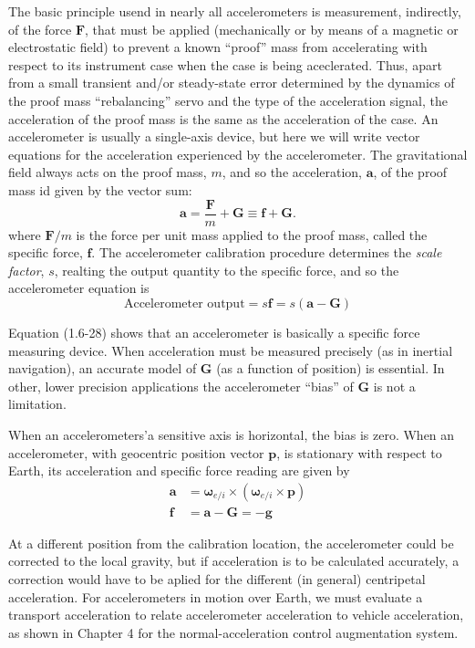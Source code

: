 The basic principle usend in nearly all accelerometers is measurement, indirectly, of the force \(\mathbf{F}\), that must be applied (mechanically or by means of a magnetic or electrostatic field) to prevent a known ``proof'' mass from accelerating with respect to its instrument case when the case is being aceclerated. Thus, apart from a small transient and/or steady-state error determined by the dynamics of the proof mass ``rebalancing'' servo and the type of the acceleration signal, the acceleration of the proof mass is the same as the acceleration of the case. An accelerometer is usually a single-axis device, but here we will write vector equations for the acceleration experienced by the accelerometer. The gravitational field always acts on the proof mass, \(m\), and so the acceleration, \(\mathbf{a}\), of the proof mass id given by the vector sum:
\begin{equation*}
    \mathbf{a} = \dfrac{\mathbf{F}}{m} + \mathbf{G} \equiv \mathbf{f} + \mathbf{G}.
\end{equation*}
where \(\mathbf{F}/m\) is the force per unit mass applied to the proof mass, called the specific force, \(\mathbf{f}\). The accelerometer calibration procedure determines the \textit{scale factor}, \(s\), realting the output quantity to the specific force, and so the accelerometer equation is
\begin{equation*} \tag{1.6-28}
    \text{Accelerometer output} = s \mathbf{f} = s \left(\mathbf{a} - \mathbf{G} \right)
\end{equation*}

Equation (1.6-28) shows that an accelerometer is basically a specific force measuring device. When acceleration must be measured precisely (as in inertial navigation), an accurate model of \(\mathbf{G}\) (as a function of position) is essential. In other, lower precision applications the accelerometer ``bias'' of \(\mathbf{G}\) is not a limitation.

When an accelerometers'a sensitive axis is horizontal, the bias is zero. When an accelerometer, with geocentric position vector \(\mathbf{p}\), is stationary with respect to Earth, its acceleration and specific force reading are given by
\begin{align*}
    \mathbf{a} &= {\mathbf{\omega}_{e/i}}\!\times\!\left({\mathbf{\omega}_{e/i}}\!\times\!{\mathbf{p}}\right) \\
    \mathbf{f} &= \mathbf{a} - \mathbf{G} = -\!{\mathbf{g}} \tag{1.6-29}
\end{align*}

At a different position from the calibration location, the accelerometer could be corrected to the local gravity, but if acceleration is to be calculated accurately, a correction would have to be aplied for the different (in general) centripetal acceleration. For accelerometers in motion over Earth, we must evaluate a transport acceleration to relate accelerometer acceleration to vehicle acceleration, as shown in Chapter 4 for the normal-acceleration control augmentation system.
